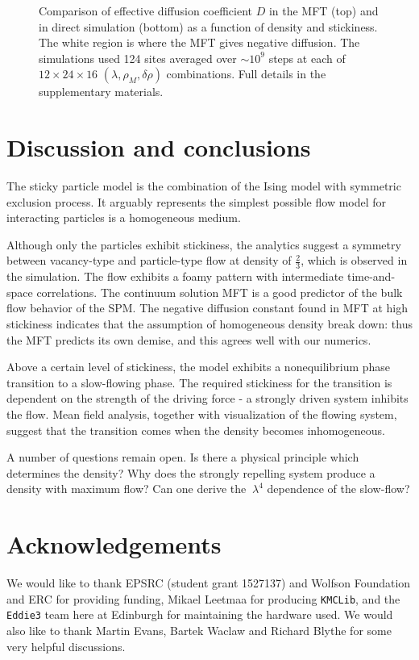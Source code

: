 \documentclass[
reprint, amsmath,amssymb,
]{revtex4-1}
\begin{document}
\begin{figure}[h!]
\begin{center}
\begin{tabular}{c}
    \end{tabular}
\end{center}
\caption{\label{fig:diffCoef}
Comparison of effective diffusion coefficient $D$ in the MFT (top) and in direct simulation (bottom) as a function of density and stickiness.
The white region is where the MFT gives negative diffusion. The simulations used 124 sites averaged over $\sim 10^9$ steps at each of $12 \times 24 \times 16 $ $(\lambda, \rho_M, \delta \rho)$ combinations.  
Full details in the supplementary materials.}
    \vspace{-2em}
\end{figure}




\section{Discussion and conclusions}

The sticky particle model is the combination of the Ising model with
symmetric exclusion process.  It arguably represents the simplest
possible flow model for interacting particles is a homogeneous medium.

Although only the particles exhibit
stickiness, the analytics suggest a symmetry between vacancy-type and
particle-type flow at density of $\frac{2}{3}$, which is observed in
the simulation.  The flow exhibits a foamy pattern with intermediate
time-and-space correlations.  The continuum solution MFT is a good
predictor of the bulk flow behavior of the SPM.  The negative
diffusion constant found in MFT at high stickiness indicates that the
assumption of homogeneous density break down: thus the MFT predicts
its own demise, and this agrees well with our numerics.

Above a certain level of stickiness, the model exhibits a
nonequilibrium phase transition to a slow-flowing phase.  The required
stickiness for the transition is dependent on the strength of the
driving force - a strongly driven system inhibits the flow.  Mean field
analysis, together with visualization of the flowing system, suggest
that the transition comes when the density becomes inhomogeneous.

A number of questions remain open. Is there a physical principle which
determines the density?  Why does the strongly repelling system
produce a density with maximum flow?  Can one derive the $~\lambda^4$
dependence of the slow-flow?

\section*{Acknowledgements}
We would like to thank EPSRC (student grant 1527137) and Wolfson
Foundation and ERC for providing funding, Mikael Leetmaa for producing
\texttt{KMCLib}, and the \texttt{Eddie3} team here at Edinburgh for
maintaining the hardware used.  We would also like to thank Martin
Evans, Bartek Waclaw and Richard Blythe for some very helpful
discussions.


\end{document}
